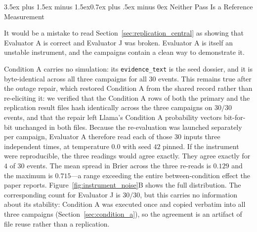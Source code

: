 \documentclass[11pt,journal,onecolumn]{IEEEtran}
\makeatletter
\renewcommand\subsection{\@startsection{subsection}{2}{\z@}%
  {3.5ex plus 1.5ex minus 1.5ex}{0.7ex plus .5ex minus 0ex}%
  {\normalfont\normalsize\bfseries}}
\makeatother
\begin{document}
\subsection{Neither Pass Is a Reference Measurement}
\label{sec:replication_noise}

It would be a mistake to read Section~\ref{sec:replication_central} as showing that Evaluator A is correct and Evaluator J was broken. Evaluator A is itself an unstable instrument, and the campaigns contain a clean way to demonstrate it.

Condition A carries no simulation: its \texttt{evidence\_text} is the seed dossier, and it is byte-identical across all three campaigns for all $30$ events. This remains true after the outage repair, which restored Condition A from the shared record rather than re-eliciting it: we verified that the Condition A rows of both the primary and the replication result files hash identically across the three campaigns on $30/30$ events, and that the repair left Llama's Condition A probability vectors bit-for-bit unchanged in both files. Because the re-evaluation was launched separately per campaign, Evaluator A therefore read each of those $30$ inputs three independent times, at temperature $0.0$ with seed $42$ pinned. If the instrument were reproducible, the three readings would agree exactly. They agree exactly for $4$ of $30$ events. The mean spread in Brier across the three re-reads is $0.129$ and the maximum is $0.715$---a range exceeding the entire between-condition effect the paper reports. Figure~\ref{fig:instrument_noise}B shows the full distribution. The corresponding count for Evaluator J is $30/30$, but this carries no information about its stability: Condition A was executed once and copied verbatim into all three campaigns (Section~\ref{sec:condition_a}), so the agreement is an artifact of file reuse rather than a replication.
\end{document}
